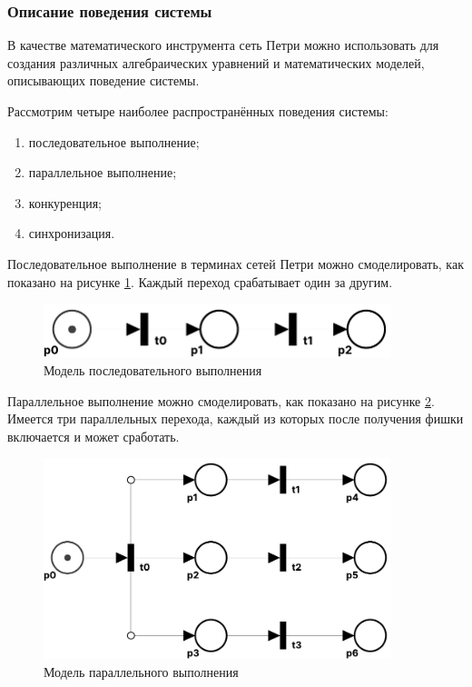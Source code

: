 \subsubsection{Описание поведения системы}

В качестве математического инструмента сеть Петри можно использовать для создания различных алгебраических уравнений и математических моделей, описывающих поведение системы.

Рассмотрим четыре наиболее распространённых поведения системы\cite{dadaya}:

\begin{enumerate}
	\item последовательное выполнение;
	
	\item параллельное выполнение;
	
	\item конкуренция;
	
	\item синхронизация.
\end{enumerate}

Последовательное выполнение в терминах сетей Петри можно смоделировать, как показано на рисунке \ref{fig:sequential}. Каждый переход срабатывает один за другим.

\begin{figure}[h!btp]
	\centering
	\includegraphics[width=0.9\textwidth]{inc/sequential.pdf}
	\caption{Модель последовательного выполнения}
	\label{fig:sequential}
\end{figure}

Параллельное выполнение можно смоделировать, как показано на рисунке \ref{fig:concurrent}. Имеется три параллельных перехода, каждый из которых после получения фишки включается и может сработать.

\begin{figure}[h!btp]
	\centering
	\includegraphics[width=0.9\textwidth]{inc/concurrent.pdf}
	\caption{Модель параллельного выполнения}
	\label{fig:concurrent}
\end{figure}

